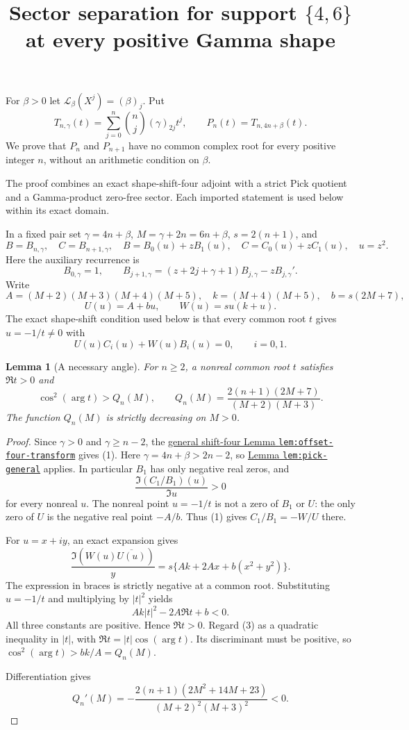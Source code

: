 \documentclass[11pt]{article}
\newtheorem{lemma}{Lemma}
\begin{document}
\setlength{\emergencystretch}{1em}
\title{Sector separation for support $\{4,6\}$ at every positive Gamma shape}
\author{}\date{}\maketitle
For $\beta>0$ let $\mathcal L_\beta(X^j)=(\beta)_j$.  Put
\[
 T_{n,\gamma}(t)=\sum_{j=0}^n\binom nj(\gamma)_{2j}t^j,\qquad
 P_n(t)=T_{n,4n+\beta}(t).
\]
We prove that $P_n$ and $P_{n+1}$ have no common complex root for
every positive integer $n$, without an arithmetic condition on $\beta$.

The proof combines an exact shape-shift-four adjoint with a strict
Pick quotient and a Gamma-product zero-free sector.  Each imported
statement is used below within its exact domain.

In a fixed pair set $\gamma=4n+\beta$, $M=\gamma+2n=6n+\beta$,
$s=2(n+1)$, and
\[
 B=B_{n,\gamma},\quad C=B_{n+1,\gamma},\quad
 B=B_0(u)+zB_1(u),\quad C=C_0(u)+zC_1(u),\quad u=z^2.
\]
Here the auxiliary recurrence is
\[
 B_{0,\gamma}=1,\qquad
 B_{j+1,\gamma}=(z+2j+\gamma+1)B_{j,\gamma}-zB_{j,\gamma}'.
\]
Write
\[
 A=(M+2)(M+3)(M+4)(M+5),\quad
 k=(M+4)(M+5),\quad b=s(2M+7),
\]
\[
 U(u)=A+bu,\qquad W(u)=su(k+u).
\]
The exact shape-shift condition used below is that every common
root $t$ gives $u=-1/t\ne0$ with
\[
 U(u)C_i(u)+W(u)B_i(u)=0,\qquad i=0,1.                 \tag{1}
\]

\begin{lemma}[A necessary angle]\label{lem:four-sector-angle}
For $n\ge2$, a nonreal common root $t$ satisfies $\Re t>0$ and
\[
 \cos^2(\arg t)>Q_n(M),\qquad
 Q_n(M)=\frac{2(n+1)(2M+7)}{(M+2)(M+3)}.              \tag{2}
\]
The function $Q_n(M)$ is strictly decreasing on $M>0$.
\end{lemma}
\begin{proof}
Since $\gamma>0$ and $\gamma\ge n-2$, the
\href{LOWER_FOUR_QUADRATIC_GAP_SFC.tex}
{general shift-four Lemma \texttt{lem:offset-four-transform}}
gives (1).  Here $\gamma=4n+\beta>2n-2$, so
\href{LOWER_FIVE_QUADRATIC_SECTOR_SFC.tex}
{Lemma \texttt{lem:pick-general}} applies.
In particular $B_1$ has only negative real zeros, and
\[
 \frac{\Im(C_1/B_1)(u)}{\Im u}>0
\]
for every nonreal $u$.  The nonreal point $u=-1/t$ is not a zero
of $B_1$ or $U$: the only zero of $U$ is the negative real point
$-A/b$.  Thus (1) gives $C_1/B_1=-W/U$ there.

For $u=x+iy$, an exact expansion gives
\[
 \frac{\Im(W(u)\overline{U(u)})}{y}
       =s\{Ak+2Ax+b(x^2+y^2)\}.
\]
The expression in braces is strictly negative at a common root.
Substituting $u=-1/t$ and multiplying by $|t|^2$ yields
\[
 Ak|t|^2-2A\Re t+b<0.                                \tag{3}
\]
All three constants are positive.  Hence $\Re t>0$.
Regard (3) as a quadratic inequality in $|t|$, with
$\Re t=|t|\cos(\arg t)$.  Its discriminant must be positive,
so $\cos^2(\arg t)>bk/A=Q_n(M)$.

Differentiation gives
\[
 Q_n'(M)=
 -\frac{2(n+1)(2M^2+14M+23)}{(M+2)^2(M+3)^2}<0.
\]
\end{proof}
\end{document}
